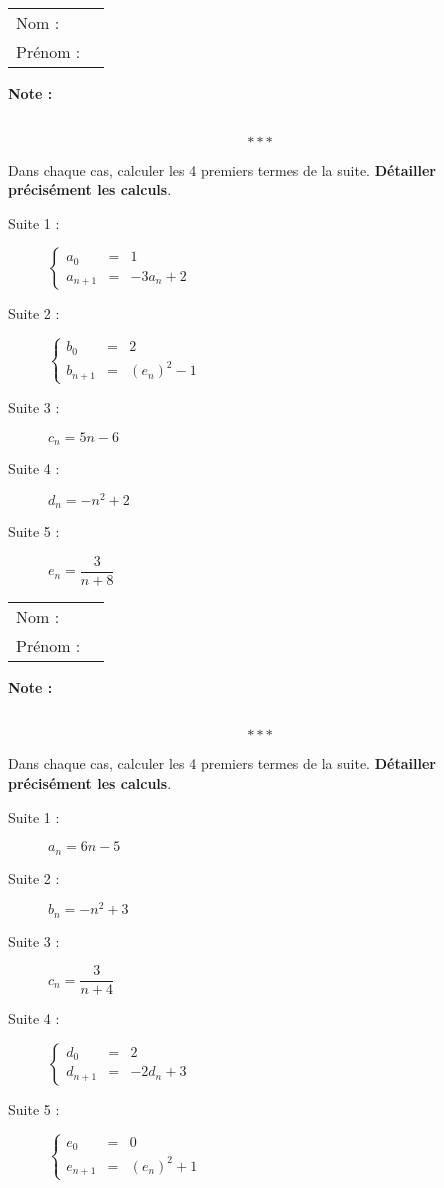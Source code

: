 \documentclass[10pt,french]{article}
\newcommand\competences{
\setcounter{exo}{0}\renewcommand\arraystretch{1.2}
\begin{tabular}{ll} Nom : \\[5pt] Prénom : \end{tabular}
\hfill
\textbf{Note :}
\begin{tabular}{|c|}
\hline
\slashbox{\Huge\bfseries\phantom{10}}{\Huge\bfseries 10}\\
\hline
\end{tabular}\renewcommand\arraystretch{1}
\[***\]
}
\begin{document}
\competences

Dans chaque cas, calculer les 4 premiers termes de la suite. \textbf{Détailler précisément les calculs}.

\begin{description}
    \item[Suite 1 :] $\left\{\begin{array}{rcl}
                                        a_0 & = & 1 \\
                                        a_{n +1} & = & -3 a_n + 2
                                \end{array}\right.$
    \item[Suite 2 :] $\left\{\begin{array}{rcl}
                                        b_0 & = & 2 \\
                                        b_{n +1} & = & (e_n)^2  - 1
                                \end{array}\right.$
    \item[Suite 3 :] $c_n = 5n - 6$
    \item[Suite 4 :] $d_n = -n^2 + 2$
    \item[Suite 5 :] $e_n = \dfrac{3}{n + 8}$
\end{description}

\clearpage


\competences

Dans chaque cas, calculer les 4 premiers termes de la suite. \textbf{Détailler précisément les calculs}.

\begin{description}
    \item[Suite 1 :] $a_n = 6n - 5$
    \item[Suite 2 :] $b_n = -n^2 + 3$
    \item[Suite 3 :] $c_n = \dfrac{3}{n + 4}$
    \item[Suite 4 :] $\left\{\begin{array}{rcl}
                                        d_0 & = & 2 \\
                                        d_{n +1} & = & -2 d_n + 3
                                \end{array}\right.$
    \item[Suite 5 :] $\left\{\begin{array}{rcl}
                                        e_0 & = & 0 \\
                                        e_{n +1} & = & (e_n)^2 + 1
                                \end{array}\right.$
\end{description}
\end{document}
